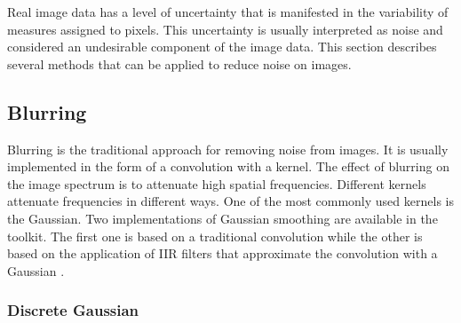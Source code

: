 Real image data has a level of uncertainty that is manifested in the
variability of measures assigned to pixels. This uncertainty is usually
interpreted as noise and considered an undesirable component of the image
data. This section describes several methods that can be applied to reduce
noise on images.

\subsection{Blurring}
\label{sec:BlurringFilters}

Blurring is the traditional approach for removing noise from images. It is
usually implemented in the form of a convolution with a kernel. The effect of
blurring on the image spectrum is to attenuate high spatial
frequencies.  Different kernels attenuate frequencies in different ways. One
of the most commonly used kernels is the Gaussian. Two implementations of
Gaussian smoothing are available in the toolkit. The first one is based on a
traditional convolution while the other is based on the application of IIR
filters that approximate the convolution with a Gaussian
\cite{Deriche1990,Deriche1993}.

\subsubsection{Discrete Gaussian}
\label{sec:DiscreteGaussianImageFilter}

\ifitkFullVersion

\fi








